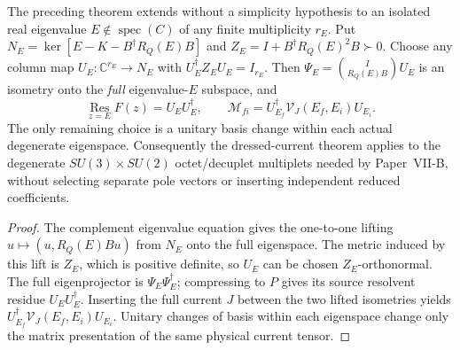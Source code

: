 \documentclass[12pt,a4paper]{article}
\begin{document}
\begin{corollary}
\label{p10:cor:v375-degenerate-multiplet-vertex}
The preceding theorem extends without a simplicity hypothesis to
an isolated real eigenvalue $E\notin\operatorname{spec}(C)$ of any
finite multiplicity $r_E$. Put
$N_E=\ker[E-K-B^\dagger R_Q(E)B]$ and
$Z_E=I+B^\dagger R_Q(E)^2B\succ0$.
Choose any column map $U_E:\mathbb C^{r_E}\to N_E$
with $U_E^\dagger Z_EU_E=I_{r_E}$.
Then $\Psi_E=\binom{I}{R_Q(E)B}U_E$ is an isometry onto the
\emph{full} eigenvalue-$E$ subspace, and
\[
\boxed{
 \operatorname*{Res}_{z=E}F(z)=U_EU_E^\dagger,
 \qquad \mathcal M_{fi}=U_{E_f}^\dagger
 \mathcal V_J(E_f,E_i)U_{E_i}.}
\]
The only remaining choice is a unitary basis change within each
actual degenerate eigenspace. Consequently the dressed-current theorem
applies to the degenerate $SU(3)\times SU(2)$ octet/decuplet
multiplets needed by Paper~VII-B, without selecting separate pole
vectors or inserting independent reduced coefficients.
\end{corollary}
\begin{proof}
The complement eigenvalue equation gives the one-to-one lifting
$u\mapsto (u,R_Q(E)Bu)$ from $N_E$ onto the full eigenspace.
The metric induced by this lift is $Z_E$, which is positive definite,
so $U_E$ can be chosen $Z_E$-orthonormal. The full eigenprojector
is $\Psi_E\Psi_E^\dagger$; compressing to $P$ gives its
source resolvent residue $U_EU_E^\dagger$. Inserting the full
current $J$ between the two lifted isometries yields
$U_{E_f}^\dagger\mathcal V_J(E_f,E_i)U_{E_i}$.
Unitary changes of basis within each eigenspace change only the
matrix presentation of the same physical current tensor.
\end{proof}
\end{document}
